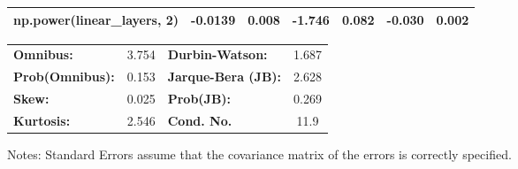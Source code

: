 \begin{center}
\begin{tabular}{lcccccc}
\textbf{np.power(linear\_layers, 2)}      &      -0.0139  &        0.008     &    -1.746  &         0.082        &       -0.030    &        0.002     \\
\bottomrule
\end{tabular}
\begin{tabular}{lclc}
\textbf{Omnibus:}       &  3.754 & \textbf{  Durbin-Watson:     } &    1.687  \\
\textbf{Prob(Omnibus):} &  0.153 & \textbf{  Jarque-Bera (JB):  } &    2.628  \\
\textbf{Skew:}          &  0.025 & \textbf{  Prob(JB):          } &    0.269  \\
\textbf{Kurtosis:}      &  2.546 & \textbf{  Cond. No.          } &     11.9  \\
\bottomrule
\end{tabular}
\end{center}

Notes: \newline
 [1] Standard Errors assume that the covariance matrix of the errors is correctly specified.